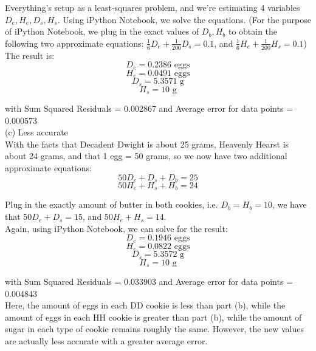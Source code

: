 \documentclass{article}
\begin{document}
Everything's setup as a least-squares problem, and we're estimating 4 variables $D_e, H_e, D_s, H_s$. Using iPython Notebook, we solve the equations. (For the purpose of iPython Notebook, we plug in the exact values of $D_b, H_b$ to obtain the following two approximate equations:
$\frac{1}{6}D_e + \frac{1}{200}D_s = 0.1$, and
$\frac{1}{6}H_e + \frac{1}{200}H_s = 0.1$) \\

The result is:
$$D_e = 0.2386 \text{ eggs}$$
$$H_e = 0.0491 \text{ eggs}$$
$$D_s = 5.3571 \text{ g}$$
$$H_s = 10 \text{ g}$$

with Sum Squared Residuals = 0.002867 and Average error for data points = 0.000573 \\[.5cm]
{\color{red} (c) Less accurate} \\

With the facts that Decadent Dwight is about 25 grams, Heavenly Hearst is about 24 grams, and that 1 egg = 50 grams, so we now have two additional {\color{blue} approximate} equations:
$$50D_e + D_s + D_b = 25$$
$$50H_e + H_s + H_b = 24$$

Plug in the exactly amount of butter in both cookies, i.e. $D_b = H_b = 10$, we have that $50D_e + D_s = 15$, and $50H_e + H_s = 14$. \\

Again, using iPython Notebook, we can solve for the result:
$$D_e = 0.1946 \text{ eggs}$$
$$H_e = 0.0822 \text{ eggs}$$
$$D_s = 5.3572 \text{ g}$$
$$H_s = 10 \text{ g}$$

with Sum Squared Residuals = 0.033903 and Average error for data points = 0.004843 \\

Here, the amount of eggs in each DD cookie is less than part (b), while the amount of eggs in each HH cookie is greater than part (b), while the amount of sugar in each type of cookie remains roughly the same. However, the new values are actually {\color{red} less accurate} with a greater average error.
\\[.5cm]
\end{document}
